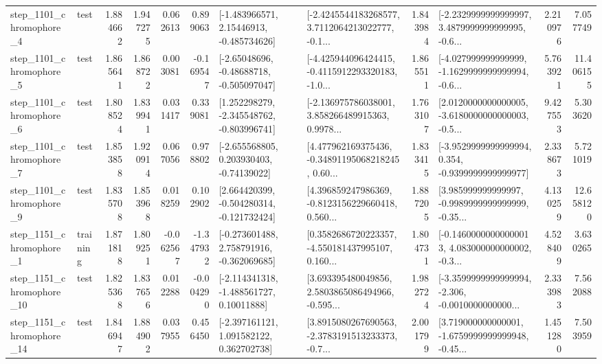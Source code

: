\begin{tabular}{llrrrrllrlrr}
  step\_1101\_chromophore\_4 &      test &      1.884662 &    1.947275 &      0.062613 &  0.899063 &    [-1.483966571, 2.15446913, -0.485734626] &  [-2.4245544183268577, 3.7112064213022777, -0.1... &       1.843984 &  [-2.2329999999999997, 3.4879999999999995, -0.6... &            2.210976 &          7.057749 \\
  step\_1101\_chromophore\_5 &      test &      1.865641 &    1.868722 &      0.003081 & -0.169547 &    [-2.65048696, -0.48688718, -0.505097047] &  [-4.425944096424415, -0.4115912293320183, -1.0... &       1.865511 &  [-4.027999999999999, -1.1629999999999994, -0.6... &            5.763921 &         11.406155 \\
  step\_1101\_chromophore\_6 &      test &      1.808524 &    1.839941 &      0.031417 &  0.339081 &   [1.252298279, -2.345548762, -0.803996741] &  [-2.136975786038001, 3.858266489915363, 0.9978... &       1.763107 &  [2.0120000000000005, -3.6180000000000003, -0.5... &            9.427553 &          5.303620 \\
  step\_1101\_chromophore\_7 &      test &      1.853858 &    1.920914 &      0.067056 &  0.978802 &    [-2.655568805, 0.203930403, -0.74139022] &  [4.477962169375436, -0.34891195068218245, 0.60... &       1.833415 &  [-3.9529999999999994, 0.354, -0.9399999999999977] &            2.338673 &          5.721019 \\
  step\_1101\_chromophore\_9 &      test &      1.835708 &    1.853968 &      0.018259 &  0.102902 &   [2.664420399, -0.504280314, -0.121732424] &  [4.396859247986369, -0.8123156229660418, 0.560... &       1.887205 &  [3.985999999999997, -0.9989999999999999, -0.35... &            4.130259 &         12.658120 \\
  step\_1151\_chromophore\_1 &  training &      1.871818 &    1.809251 &     -0.062567 & -1.347932 &   [-0.273601488, 2.758791916, -0.362069685] &  [0.3582686720223357, -4.550181437995107, 0.160... &       1.804731 &  [-0.14600000000000013, 4.083000000000002, -0.3... &            4.528409 &          3.630265 \\
 step\_1151\_chromophore\_10 &      test &      1.825368 &    1.837656 &      0.012288 & -0.004290 &    [-2.114341318, -1.488561727, 0.10011888] &  [3.693395480049856, 2.5803865086494966, -0.595... &       1.982724 &  [-3.3599999999999994, -2.306, -0.0010000000000... &            2.333983 &          7.562088 \\
 step\_1151\_chromophore\_14 &      test &      1.846947 &    1.884902 &      0.037955 &  0.456450 &    [-2.397161121, 1.091582122, 0.362702738] &  [3.8915080267690563, -2.3783191513233373, -0.7... &       2.001799 &  [3.719000000000001, -1.6759999999999948, -0.45... &            1.451280 &          7.503959 \\

\end{tabular}
